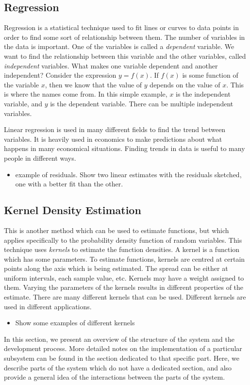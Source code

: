 \documentclass[a4paper,11pt]{article}
\begin{document}
\subsection{Regression}
\label{sec-2-3}

Regression is a statistical technique used to fit lines or curves to data
points in order to find some sort of relationship between them. The number of
variables in the data is important. One of the variables is called a \emph{dependent}
variable. We want to find the relationship between this variable and the other
variables, called \emph{independent} variables. What makes one variable
dependent and another independent? Consider the expression $y=f(x)$. If $f(x)$
is some function of the variable $x$, then we know that the value of $y$ depends
on the value of $x$. This is where the names come from. In this simple example,
$x$ is the independent variable, and $y$ is the dependent variable. There can be
multiple independent variables.

Linear regression is used in many different fields to find the trend between
variables. It is heavily used in economics to make predictions about what
happens in many economical situations. Finding trends in data is useful to many
people in different ways.

\begin{itemize}
\item example of residuals. Show two linear estimates with the residuals sketched,
  one with a better fit than the other.
\end{itemize}
\subsection{Kernel Density Estimation}
\label{sec-2-4}

This is another method which can be used to estimate functions, but which
applies specifically to the probability density function of random
variables. This technique uses \emph{kernels} to estimate the function
densities. A kernel is a function which has some parameters. To estimate
functions, kernels are centred at certain points along the axis which is being
estimated. The spread can be either at uniform intervals, each sample value,
etc. Kernels may have a weight assigned to them. Varying the parameters of
the kernels results in different properties of the estimate. There are many
different kernels that can be used. Different kernels are used in different
applications.
\begin{itemize}
\item Show some examples of different kernels
\end{itemize}
In this section, we present an overview of the structure of the system and the
development process. More detailed notes on the implementation of a particular
subsystem can be found in the section dedicated to that specific part. Here, we
describe parts of the system which do not have a dedicated section, and also
provide a general idea of the interactions between the parts of the system.
\end{document}

